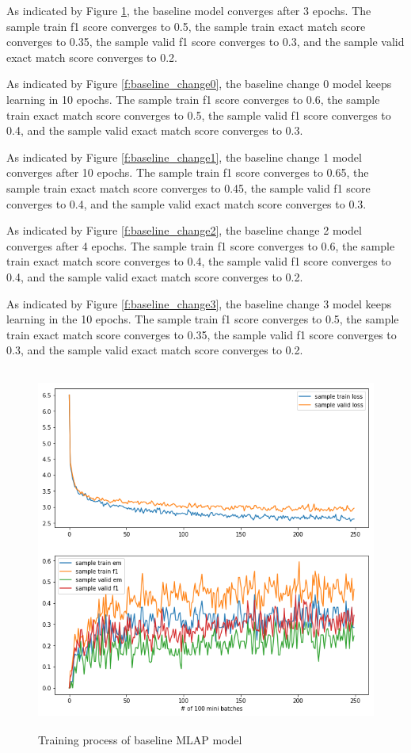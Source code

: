\documentclass[modernstyle,12pt]{sjsuthesis}
\theoremstyle{definition}
\begin{document}
As indicated by Figure \ref{f:mlap}, the baseline model converges after 3 epochs. The sample train f1 score converges to 0.5, the sample train exact match score converges to 0.35, the sample valid f1 score converges to 0.3, and the sample valid exact match score converges to 0.2.

As indicated by Figure \ref{f:baseline_change0}, the baseline change 0 model keeps learning in 10 epochs. The sample train f1 score converges to 0.6, the sample train exact match score converges to 0.5, the sample valid f1 score converges to 0.4, and the sample valid exact match score converges to 0.3.

As indicated by Figure \ref{f:baseline_change1}, the baseline change 1 model converges after 10 epochs. The sample train f1 score converges to 0.65, the sample train exact match score converges to 0.45, the sample valid f1 score converges to 0.4, and the sample valid exact match score converges to 0.3.

As indicated by Figure \ref{f:baseline_change2}, the baseline change 2 model converges after 4 epochs. The sample train f1 score converges to 0.6, the sample train exact match score converges to 0.4, the sample valid f1 score converges to 0.4, and the sample valid exact match score converges to 0.2.

As indicated by Figure \ref{f:baseline_change3}, the baseline change 3 model keeps learning in the 10 epochs. The sample train f1 score converges to 0.5, the sample train exact match score converges to 0.35, the sample valid f1 score converges to 0.3, and the sample valid exact match score converges to 0.2.

\begin{figure}[htbp]\centering
  \includegraphics[width=12cm, height=12cm]{figures/match_corrected.png}
  \caption{Training process of baseline MLAP model}
  \label{f:mlap}
\end{figure}
\end{document}
